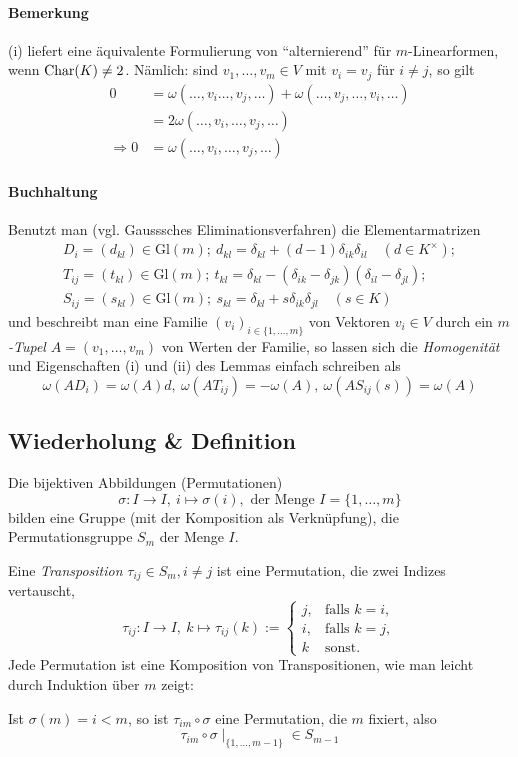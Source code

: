  	\paragraph{Bemerkung}
 		(i) liefert eine äquivalente Formulierung von "`alternierend"' für $ m $-Linearformen, wenn $ \operatorname{Char} (K)\neq 2 $.
 		Nämlich: sind $ v_1,\dots,v_m\in V $ mit $ v_i=v_j $ für $ i\neq j $, so gilt
 		\begin{align*}
 			0             & = \omega(\dots,v_i\dots,v_j,\dots)+\omega(\dots,v_j,\dots,v_i,\dots) \\
 			              & = 2\omega(\dots,v_i,\dots,v_j,\dots)                                 \\
 			\Rightarrow 0 & = \omega(\dots,v_i,\dots,v_j,\dots)
 		\end{align*}
 	\paragraph{Buchhaltung}
 		Benutzt man (vgl. Gausssches Eliminationsverfahren) die Elementarmatrizen
 		\begin{gather*}
 			D_i = (d_{kl}) \in \mathrm{Gl}(m);\ d_{kl} = \delta_{kl}+(d-1)\delta_{ik}\delta_{il}\quad (d\in K^\times);\\
 			T_{ij} = (t_{kl}) \in \mathrm{Gl}(m);\ t_{kl} = \delta_{kl}-(\delta_{ik}-\delta_{jk})(\delta_{il}-\delta_{jl});\\
 			S_{ij} = (s_{kl})\in \mathrm{Gl}(m);\ s_{kl}=\delta_{kl}+s\delta_{ik}\delta_{jl}\quad (s\in K)
 		\end{gather*}
 		und beschreibt man eine Familie $ (v_i)_{i\in \{1,\dots,m\}} $ von Vektoren $ v_i\in V $ durch ein \emph{$ m $-Tupel} $ A=(v_1,\dots,v_m) $ von Werten der Familie, so lassen sich die \emph{Homogenität} und Eigenschaften (i) und (ii) des Lemmas einfach schreiben als
 		\[
 			\omega(AD_i) = \omega(A)d,\ \omega(AT_{ij}) = -\omega(A),\ \omega(AS_{ij}(s)) = \omega(A)
 		\]
 \subsection{Wiederholung \& Definition}
 	Die bijektiven Abbildungen (Permutationen)
 	\[
 		\sigma: I\to I,\ i\mapsto \sigma(i),\text{ der Menge }I = \{1,\dots,m\}
 	\]
 	bilden eine Gruppe (mit der Komposition als Verknüpfung), die Permutationsgruppe $ S_m $ der Menge $ I $.
 	\begin{Definition}[Transposition]
 		Eine \emph{Transposition} $ \tau_{ij} \in S_m, i\neq j $ ist eine Permutation, die zwei Indizes vertauscht,
 		\[
 			\tau_{ij}:I\to I,\ k\mapsto \tau_{ij}(k):=
 			\begin{cases}
 				j, & \text{falls } k=i, \\
 				i, & \text{falls } k=j, \\
 				k  & \text{sonst}.
 			\end{cases}
 		\]
 		Jede Permutation ist eine Komposition von Transpositionen, wie man leicht durch Induktion über $m$ zeigt:

 		Ist $ \sigma(m) = i<m$, so ist $ \tau_{im}\circ \sigma $ eine Permutation, die $ m $ fixiert, also
 		\[
 			\tau_{im}\circ\sigma\mid_{\{1,\dots,m-1\}}\in S_{m-1}
 		\]
 	\end{Definition}
